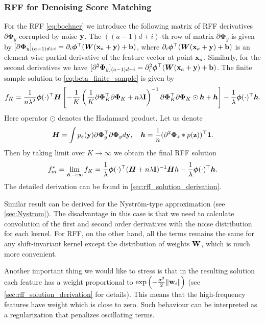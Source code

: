 \subsubsection{RFF for Denoising Score Matching}
For the RFF \eqref{eq:bochner}
we introduce the following matrix of RFF derivatives $\partial {\bm \Phi}_y$
corrupted by noise $\bf{y}$.
The $((a - 1)d + i)$-th row of matrix $\partial {\bm \Phi}_y$ is given by
$[\partial \bm{\Phi}_y]_{(a - 1)d + i} = \partial_i \bm{\phi}^\top(\bm{W}({\bf x}_a + \bf{y}) + \bm{b})$,
where $\partial_i \bm{\phi}^\top(\bm{W}({\bf x}_a + \bf{y}) + \bm{b})$
is an element-wise partial derivative of the feature vector at point ${\bf x}_a$.
Similarly, for the second derivatives we have
$[\partial^2 \bm{\Phi}_y]_{(a - 1)d + i} =
\partial^2_i \bm{\phi}^\top(\bm{W}({\bf x}_a + \bf{y}) + \bm{b})$.
The finite sample solution to \eqref{eq:beta_finite_sample} is given by
\[
    f_K
    = \frac{1}{n\lambda^2}{\bm \phi}(\cdot)^{\top}{\bm H}
    \left[-\frac{1}{K}\left(\frac{1}{K}\partial  {\bm \Phi}_K^{\top}\partial{\bm \Phi}_K + n\lambda {\bf I}\right)^{-1}\partial {\bm \Phi}_K^{\top}\partial{\bm \Phi}_K \odot {\bm h} + {\bm h}\right]
    -\frac{1}{\lambda} {\bm \phi}(\cdot)^{\top}{\bm h}.
\]
Here operator $\odot$ denotes the Hadamard product.
Let us denote
\begin{equation}
    \label{eq:h}
    {\bm H} = \int p_{\varepsilon}({\bf y})\partial{\bm \Phi}_y^{\top}\partial{\bm \Phi}_y
    d{\bf y},
    \quad
    {\bm h} = \frac{1}{n}(\partial^2 {\bm \Phi}_z * p({\bf z}))^{\top}{\bf 1}.
\end{equation}
Then by taking limit over $K \to \infty$ we obtain the final RFF solution
\begin{equation}
\label{eq:rff_f}
    f_{m}^* = \lim\limits_{K \to \infty} f_K
    = \frac{1}{\lambda}{\bm \phi}(\cdot)^{\top}({\bm H} + n\lambda{\bf I})^{-1}{\bm Hh}
    - \frac{1}{\lambda}{\bm \phi}(\cdot)^{\top}{\bm h}.
\end{equation}
The detailed derivation can be found in \ref{sec:rff_solution_derivation}.

Similar result can be derived for the Nystr\"om-type approximation
(see \ref{sec:Nystrom}).
The disadvantage in this case is that we need to calculate
convolution of the first and second order derivatives with the noise distribution
for each kernel.
For RFF, on the other hand, all the terms remains the same for any shift-invariant kernel
except the distribution of weights $\bf{W}$, which is much more convenient.

Another important thing we would like to stress is that in the resulting solution
each feature has a weight proportional to
$\exp \left ( -\frac{\sigma^2}{2} \|{\bf w}_i\| \right )$
(see \ref{sec:rff_solution_derivation} for details).
This means that the high-frequency features have weight which is close to zero.
Such behaviour can be interpreted as a regularization that penalizes
oscillating terms.

